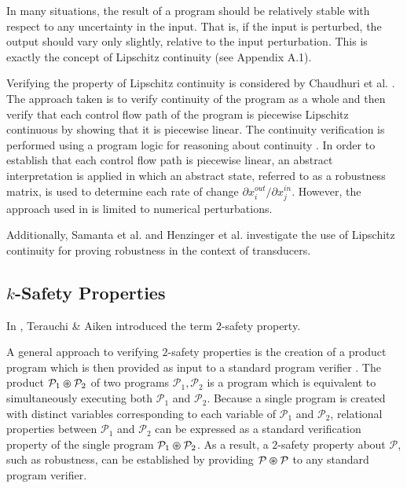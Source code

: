\documentclass{llncs}
\begin{document}
    \space\space 
    In many situations, the result of a program should be relatively
    stable with respect to any uncertainty in the input.  That is, if the input is
    perturbed, the output should vary only slightly, relative to the input
    perturbation.  This is exactly the concept of Lipschitz continuity (see Appendix A.1).

    Verifying the property of Lipschitz continuity is considered by Chaudhuri et al.
    \cite{chaudhuri11}.  The approach taken is to verify continuity of
    the program as a whole and then verify that each control flow path of the
    program is piecewise Lipschitz continuous by showing that it is piecewise
    linear.  The continuity verification is performed using a program logic for
    reasoning about continuity \cite{chaudhuri10}.  In order to establish that each
    control flow path is piecewise linear, an abstract interpretation is applied in
    which an abstract state, referred to as a robustness matrix, is used to
    determine each rate of change \(\partial x_{i}^{out}/\partial x_{j}^{in}\).
    However, the approach used in
    \cite{chaudhuri10,chaudhuri11} is limited to numerical perturbations. 

    Additionally, Samanta et al. \cite{samanta13} and
    Henzinger et al. \cite{samanta14} investigate the use of Lipschitz continuity
    for proving robustness in the context of transducers.

  \subsection{$k$-Safety Properties}
    \space\space In \cite{terauchi05},
    Terauchi \& Aiken introduced the term \(2\)-safety property.

    A general approach to verifying \(2\)-safety properties is the creation of a
    product program which is then provided as input to a standard program verifier
    \cite{bartheproduct}.  The product \(\mathcal{P}_{1} \varoast \mathcal{P}_{2}\)
    of two programs \(\mathcal{P}_{1}, \mathcal{P}_{2}\) is a program which is
    equivalent to simultaneously executing both \(\mathcal{P}_{1}\) and
    \(\mathcal{P}_{2}\).  Because a single program is created with distinct
    variables corresponding to each variable of \(\mathcal{P}_{1}\) and
    \(\mathcal{P}_{2}\), relational properties between \(\mathcal{P}_{1}\) and
    \(\mathcal{P}_{2}\) can be expressed as a standard verification property of the
    single program \(\mathcal{P}_{1} \varoast \mathcal{P}_{2}\).  As a result, a
    \(2\)-safety property about \(\mathcal{P}\), such as robustness, can be
    established by providing \(\mathcal{P} \varoast \mathcal{P}\) to any standard
    program verifier.
\end{document}
